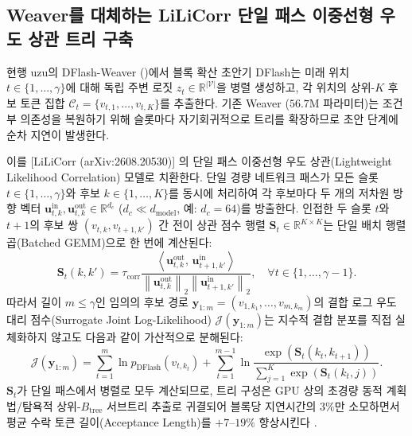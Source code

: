 \documentclass[10pt,a4paper]{article}
\begin{document}
\subsection{\textsf{Weaver}를 대체하는 \textsf{LiLiCorr} 단일 패스 이중선형 우도 상관 트리 구축}
현행 \textsf{uzu}의 \textsf{DFlash-Weaver} (\cite{oda2026trees,mirai2026specdec})에서 블록 확산 초안기 \textsf{DFlash}는 미래 위치 $t \in \{1,\dots,\gamma\}$에 대해 독립 주변 로짓 $z_t \in \mathbb{R}^{|\mathcal{V}|}$을 병렬 생성하고, 각 위치의 상위-$K$ 후보 토큰 집합 $\mathcal{C}_t = \{v_{t,1}, \dots, v_{t,K}\}$를 추출한다. 기존 \textsf{Weaver} ($56.7\text{M}$ 파라미터)는 조건부 의존성을 복원하기 위해 슬롯마다 자기회귀적으로 트리를 확장하므로 초안 단계에 순차 지연이 발생한다.

이를 [LiLiCorr (arXiv:2608.20530)] \cite{rusanovsky2026lilicorr}의 단일 패스 이중선형 우도 상관(Lightweight Likelihood Correlation) 모델로 치환한다. 단일 경량 네트워크 패스가 모든 슬롯 $t \in \{1,\dots,\gamma\}$와 후보 $k \in \{1,\dots,K\}$를 동시에 처리하여 각 후보마다 두 개의 저차원 방향 벡터 $\mathbf{u}_{t,k}^{\text{in}}, \mathbf{u}_{t,k}^{\text{out}} \in \mathbb{R}^{d_c}$ ($d_c \ll d_{\text{model}}$, 예: $d_c = 64$)를 방출한다. 인접한 두 슬롯 $t$와 $t+1$의 후보 쌍 $(v_{t,k}, v_{t+1,k'})$ 간 전이 상관 점수 행렬 $\mathbf{S}_t \in \mathbb{R}^{K \times K}$는 단일 배치 행렬 곱(Batched GEMM)으로 한 번에 계산된다:
\begin{equation}
\mathbf{S}_t(k, k') = \tau_{\text{corr}} \frac{\left\langle \mathbf{u}_{t,k}^{\text{out}}, \, \mathbf{u}_{t+1,k'}^{\text{in}} \right\rangle}{\left\| \mathbf{u}_{t,k}^{\text{out}} \right\|_2 \left\| \mathbf{u}_{t+1,k'}^{\text{in}} \right\|_2}, \quad \forall t \in \{1, \dots, \gamma - 1\}.
\label{eq:lilicorr_cosine}
\end{equation}
따라서 길이 $m \le \gamma$인 임의의 후보 경로 $\mathbf{y}_{1:m} = (v_{1,k_1}, \dots, v_{m,k_m})$의 결합 로그 우도 대리 점수(Surrogate Joint Log-Likelihood) $\mathcal{J}(\mathbf{y}_{1:m})$는 지수적 결합 분포를 직접 실체화하지 않고도 다음과 같이 가산적으로 분해된다:
\begin{equation}
\mathcal{J}(\mathbf{y}_{1:m}) = \sum_{t=1}^{m} \ln p_{\text{DFlash}}(v_{t,k_t}) + \sum_{t=1}^{m-1} \ln \frac{\exp\left(\mathbf{S}_t(k_t, k_{t+1})\right)}{\sum_{j=1}^K \exp\left(\mathbf{S}_t(k_t, j)\right)}.
\label{eq:lilicorr_joint}
\end{equation}
$\mathbf{S}_t$가 단일 패스에서 병렬로 모두 계산되므로, 트리 구성은 GPU 상의 초경량 동적 계획법/탐욕적 상위-$B_{\text{tree}}$ 서브트리 추출로 귀결되어 블록당 지연시간의 $3\%$만 소모하면서 평균 수락 토큰 길이(Acceptance Length)를 $+7\text{--}19\%$ 향상시킨다 \cite{rusanovsky2026lilicorr}.
\end{document}
